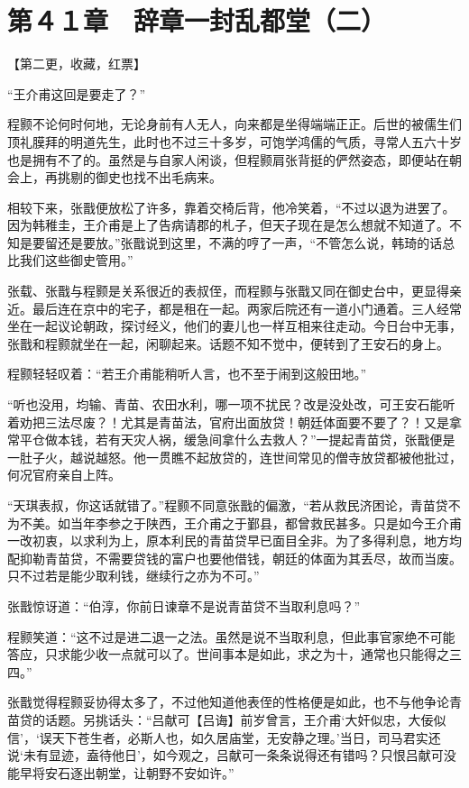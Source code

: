 \section{第４１章　辞章一封乱都堂（二）}

【第二更，收藏，红票】

“王介甫这回是要走了？”

程颢不论何时何地，无论身前有人无人，向来都是坐得端端正正。后世的被儒生们顶礼膜拜的明道先生，此时也不过三十多岁，可饱学鸿儒的气质，寻常人五六十岁也是拥有不了的。虽然是与自家人闲谈，但程颢肩张背挺的俨然姿态，即便站在朝会上，再挑剔的御史也找不出毛病来。

相较下来，张戬便放松了许多，靠着交椅后背，他冷笑着，“不过以退为进罢了。因为韩稚圭，王介甫是上了告病请郡的札子，但天子现在是怎么想就不知道了。不知是要留还是要放。”张戬说到这里，不满的哼了一声，“不管怎么说，韩琦的话总比我们这些御史管用。”

张载、张戬与程颢是关系很近的表叔侄，而程颢与张戬又同在御史台中，更显得亲近。最后连在京中的宅子，都是租在一起。两家后院还有一道小门通着。三人经常坐在一起议论朝政，探讨经义，他们的妻儿也一样互相来往走动。今日台中无事，张戬和程颢就坐在一起，闲聊起来。话题不知不觉中，便转到了王安石的身上。

程颢轻轻叹着：“若王介甫能稍听人言，也不至于闹到这般田地。”

“听也没用，均输、青苗、农田水利，哪一项不扰民？改是没处改，可王安石能听着劝把三法尽废？！尤其是青苗法，官府出面放贷！朝廷体面要不要了？！又是拿常平仓做本钱，若有天灾人祸，缓急间拿什么去救人？”一提起青苗贷，张戬便是一肚子火，越说越怒。他一贯瞧不起放贷的，连世间常见的僧寺放贷都被他批过，何况官府亲自上阵。

“天琪表叔，你这话就错了。”程颢不同意张戬的偏激，“若从救民济困论，青苗贷不为不美。如当年李参之于陕西，王介甫之于鄞县，都曾救民甚多。只是如今王介甫一改初衷，以求利为上，原本利民的青苗贷早已面目全非。为了多得利息，地方均配抑勒青苗贷，不需要贷钱的富户也要他借钱，朝廷的体面为其丢尽，故而当废。只不过若是能少取利钱，继续行之亦为不可。”

张戬惊讶道：“伯淳，你前日谏章不是说青苗贷不当取利息吗？”

程颢笑道：“这不过是进二退一之法。虽然是说不当取利息，但此事官家绝不可能答应，只求能少收一点就可以了。世间事本是如此，求之为十，通常也只能得之三四。”

张戬觉得程颢妥协得太多了，不过他知道他表侄的性格便是如此，也不与他争论青苗贷的话题。另挑话头：“吕献可【吕诲】前岁曾言，王介甫‘大奸似忠，大佞似信’，‘误天下苍生者，必斯人也，如久居庙堂，无安静之理。’当日，司马君实还说‘未有显迹，盍待他日’，如今观之，吕献可一条条说得还有错吗？只恨吕献可没能早将安石逐出朝堂，让朝野不安如许。”

